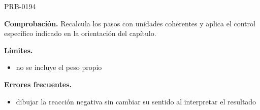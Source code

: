 \begin{studiumworked}{PRB-0194}
\par\textbf{Comprobación.} Recalcula los pasos con unidades coherentes y aplica el control específico indicado en la orientación del capítulo.

\textbf{Límites.}\begin{itemize}\item no se incluye el peso propio\end{itemize}

\textbf{Errores frecuentes.}\begin{itemize}\item dibujar la reacción negativa sin cambiar su sentido al interpretar el resultado\end{itemize}

\end{studiumworked}

\Needspace{.3\textheight}

